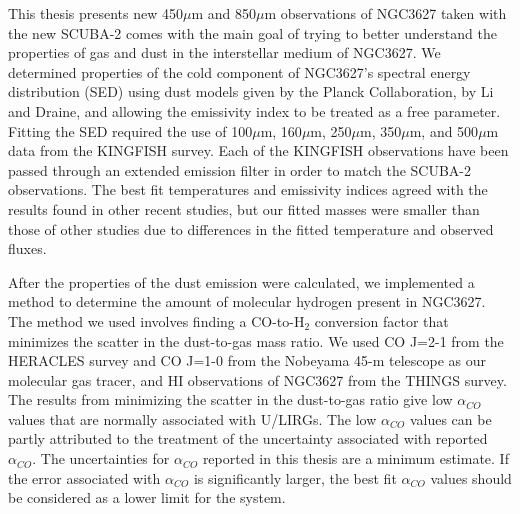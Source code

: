 This thesis presents new 450$\mu$m and 850$\mu$m observations of NGC3627 taken with the new SCUBA-2 comes with the main goal of trying to better understand the properties of gas and dust in the interstellar medium of NGC3627.  We determined properties of the cold component of NGC3627's spectral energy distribution (SED) using dust models given by the Planck Collaboration, by Li and Draine, and allowing the emissivity index to be treated as a free parameter.  Fitting the SED required the use of 100$\mu$m, 160$\mu$m, 250$\mu$m, 350$\mu$m, and 500$\mu$m data from the KINGFISH survey.  Each of the KINGFISH observations have been passed through an extended emission filter in order to match the SCUBA-2 observations.  The best fit temperatures and emissivity indices agreed with the results found in other recent studies, but our fitted masses were smaller than those of other studies due to differences in the fitted temperature and observed fluxes.

After the properties of the dust emission were calculated, we implemented a method to determine the amount of molecular hydrogen present in NGC3627.  The method we used involves finding a CO-to-H$_2$ conversion factor that minimizes the scatter in the dust-to-gas mass ratio. We used CO J=2-1 from the HERACLES survey and CO J=1-0 from the Nobeyama 45-m telescope as our molecular gas tracer, and HI observations of NGC3627 from the THINGS survey.  The results from minimizing the scatter in the dust-to-gas ratio give low $\alpha_{CO}$ values that are normally associated with U/LIRGs.  The low $\alpha_{CO}$ values can be partly attributed to the treatment of the uncertainty associated with reported $\alpha_{CO}$.  The uncertainties for $\alpha_{CO}$ reported in this thesis are a minimum estimate.  If the error associated with $\alpha_{CO}$ is significantly larger, the best fit $\alpha_{CO}$ values should be considered as a lower limit for the system.

